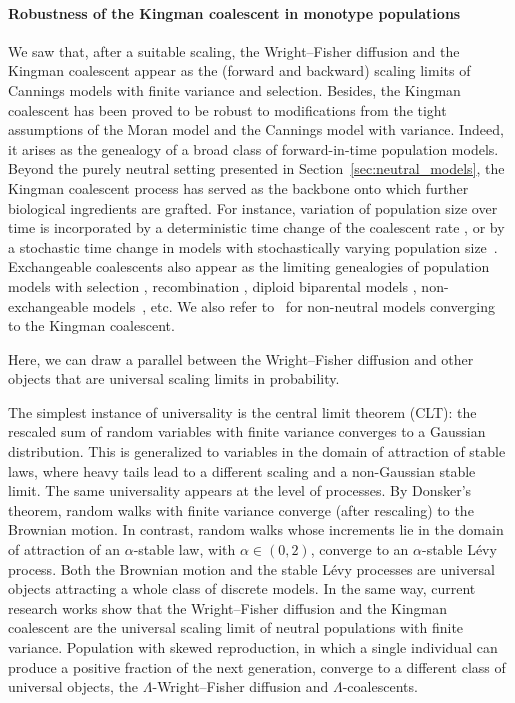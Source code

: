 \paragraph{Robustness of the Kingman coalescent in monotype populations}
We saw that, after a suitable scaling, the Wright--Fisher diffusion and the Kingman coalescent appear as the (forward and backward) scaling limits of Cannings models with finite variance and selection. 
Besides, the Kingman coalescent has been proved to be robust to modifications from the tight assumptions of the Moran model and the Cannings model with variance. Indeed, it arises as the genealogy of a broad class of forward-in-time population models. Beyond the purely neutral setting presented in Section~\ref{sec:neutral_models}, the Kingman coalescent process has served as the backbone onto which further biological ingredients are grafted. For instance, variation of population size over time is incorporated by a deterministic time change of the coalescent rate
\citep{griffiths_sampling_1994, Jagers2004ConvergenceTT}, or by a stochastic time change in models with stochastically varying population size~\cite{kaj_coalescent_2003}.
Exchangeable coalescents also appear as the limiting genealogies of population models with selection \citep{kaplan_coalescent_1988, neuhauser_genealogy_1997}, recombination \citep{hudson_coalescent_1988}, diploid biparental models \citep{wakeley_gene_2012, koskela_robust_2019}, non-exchangeable models~\citep{siri-jegousse_exchangeable_2024}, etc. 
We also refer to~\cite{Brown:2023aa} for non-neutral models converging to the Kingman coalescent. 

\medskip 

Here, we can draw a parallel between the Wright--Fisher diffusion and other objects that are universal scaling limits in probability. 

The simplest instance of universality is the central limit theorem (CLT): the rescaled sum of \iid random variables with finite variance converges to a Gaussian distribution. This is generalized to variables in the domain of attraction of stable laws, where heavy tails lead to a different scaling and a non-Gaussian stable limit. The same universality appears at the level of processes. By Donsker's theorem, random walks with finite variance converge (after rescaling) to the Brownian motion. In contrast, random walks whose increments lie in the domain of attraction of an $\alpha$-stable law, with $\alpha \in (0,2)$, converge to an $\alpha$-stable Lévy process. Both the Brownian motion and the stable Lévy processes are universal objects attracting a whole class of discrete models.
In the same way, current research works show that the Wright--Fisher diffusion and the Kingman coalescent are the universal scaling limit of neutral populations with finite variance. Population with skewed reproduction, in which a single individual can produce a positive fraction of the next generation, converge to a different class of universal objects, the $\Lambda$-Wright--Fisher diffusion and $\Lambda$-coalescents.

